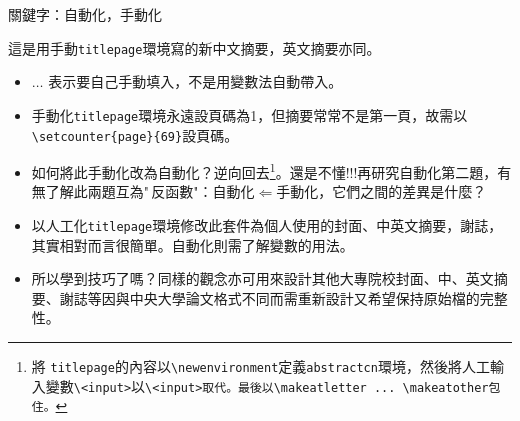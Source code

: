 \begin{appendB}
\begin{titlepage}
\vspace{1cm}

關鍵字：自動化，手動化
\vspace{2ex}

這是用手動{\tt titlepage}環境寫的新中文摘要，英文摘要亦同。

\begin{itemize}
\item $\ldots$ 表示要自己手動填入，不是用變數法自動帶入。
\item 手動化{\tt titlepage}環境永遠設頁碼為1，但摘要常常不是第一頁，故需以\verb|\setcounter{page}{69}|設頁碼。
\item 如何將此手動化改為自動化？逆向回去\footnote{將 {\tt titlepage}的內容以{\tt \textbackslash newenvironment}定義{\tt abstractcn}環境，然後將人工輸入變數{\tt \textbackslash<input>}以{\tt \textbackslash {}<input>取代。最後以{\tt \textbackslash makeatletter ... \textbackslash makeatother}包住。}}。還是不懂!!!再研究自動化第二題，有無了解此兩題互為"\,反函數"：自動化$\Leftarrow$手動化，它們之間的差異是什麼？
\item 以人工化{\tt titlepage}環境修改此套件為個人使用的封面、中英文摘要，謝誌，其實相對而言很簡單。自動化則需了解變數的用法。
\item 所以學到技巧了嗎？同樣的觀念亦可用來設計其他大專院校封面、中、英文摘要、謝誌等因與中央大學論文格式不同而需重新設計又希望保持原始檔的完整性。
\end{itemize}
\end{titlepage}

\clearpage{}
{} 
 
\end{appendB}